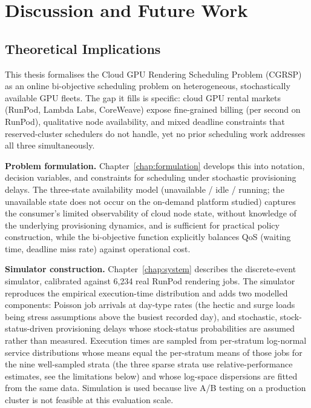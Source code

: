 \chapter{Discussion and Future Work}
\label{chap:conclusion}
{%

\section{Theoretical Implications}
\label{sec:theoretical-implications}

This thesis formalises the Cloud GPU Rendering Scheduling Problem (CGRSP) as an online bi-objective scheduling problem on heterogeneous, stochastically available GPU fleets. The gap it fills is specific: cloud GPU rental markets (RunPod, Lambda Labs, CoreWeave) expose fine-grained billing (per second on RunPod), qualitative node availability, and mixed deadline constraints that reserved-cluster schedulers do not handle, yet no prior scheduling work addresses all three simultaneously.

\textbf{Problem formulation.} Chapter~\ref{chap:formulation} develops this into notation, decision variables, and constraints for scheduling under stochastic provisioning delays. The three-state availability model (unavailable / idle / running; the unavailable state does not occur on the on-demand platform studied) captures the consumer's limited observability of cloud node state, without knowledge of the underlying provisioning dynamics, and is sufficient for practical policy construction, while the bi-objective function explicitly balances QoS (waiting time, deadline miss rate) against operational cost.

\textbf{Simulator construction.} Chapter~\ref{chap:system} describes the discrete-event simulator, calibrated against 6,234 real RunPod rendering jobs. The simulator reproduces the empirical execution-time distribution and adds two modelled components: Poisson job arrivals at day-type rates (the hectic and surge loads being stress assumptions above the busiest recorded day), and stochastic, stock-status-driven provisioning delays whose stock-status probabilities are assumed rather than measured. Execution times are sampled from per-stratum log-normal service distributions whose means equal the per-stratum means of those jobs for the nine well-sampled strata (the three sparse strata use relative-performance estimates, see the limitations below) and whose log-space dispersions are fitted from the same data. Simulation is used because live A/B testing on a production cluster is not feasible at this evaluation scale.

}
